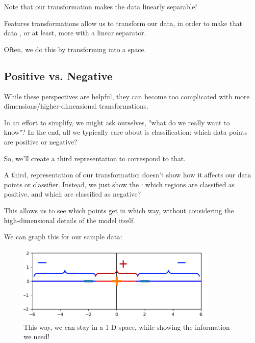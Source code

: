             Note that our transformation makes the data linearly separable!\\
    
            \begin{concept}
                Features transformations allow us to  transform our data, in order to make that data , or at least, more  with a linear separator.
    
                Often, we do this by transforming into a  space.
            \end{concept}
    
            \subsecdiv

        \subsection*{Positive vs. Negative}

            While these perspectives are helpful, they can become too complicated with more dimensions/higher-dimensional transformations.

            In an effort to simplify, we might ask ourselves, "what do we really want to know"? In the end, all we typically care about is classification: which data points are positive or negative?

            So, we'll create a third representation to correspond to that.\\

            \begin{concept}
                A third,  representation of our transformation doesn't show how it affects our data points or classifier. Instead, we just show the : which regions are classified as positive, and which are classified as negative?

                This allows us to see which points get  in which way, without considering the high-dimensional details of the model itself.
            \end{concept}

            \miniex We can graph this for our sample data:

            \begin{figure}[H]
                \centering
                \includegraphics[width=100mm,scale=0.5]{images/feature_images/positive_negative_disp.png}
                \caption*{This way, we can stay in a 1-D space, while showing the information we need!}
            \end{figure}

